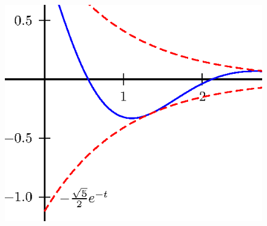 \begin{figure}[!ht]
\begin{center}

\includegraphics{cap_trans_int/pics/figura_2}\end{center}
{\caption{\label{fig_massa_mola}}}
\end{figure}

